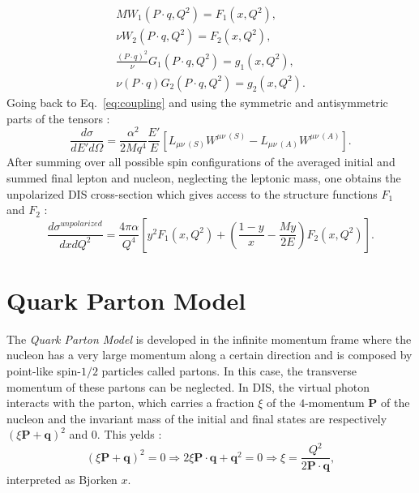 %
\begin{equation}
  \begin{split}
    MW_1(P\cdot q,Q^2)=F_1(x,Q^2), \\
    \nu W_2(P\cdot q,Q^2)=F_2(x,Q^2), \\
    \frac{(P\cdot q)^2}{\nu}G_1(P\cdot q,Q^2)=g_1(x,Q^2), \\
    \nu(P\cdot q)G_2(P\cdot q,Q^2)=g_2(x,Q^2).
  \end{split}
  \label{eq:dimless}
\end{equation}
%
Going back to Eq.~\ref{eq:coupling} and using the symmetric and antisymmetric parts of the tensors :
%
\begin{equation}
  \frac{d\sigma}{dE'd\Omega} = \frac{\alpha^2}{2Mq^4}\frac{E'}{E}\left[L_{\mu\nu\ (S)}W^{\mu\nu\ (S)}-L_{\mu\nu\ (A)}W^{\mu\nu\ (A)}\right].
\end{equation}
%
After summing over all possible spin configurations of the averaged initial and summed final lepton and nucleon, neglecting the leptonic mass, one obtains the unpolarized DIS cross-section which gives access to the structure functions $F_1$ and $F_2$ :
%
\begin{equation}
  \frac{d\sigma^{unpolarized}}{dxdQ^2} = \frac{4\pi\alpha}{Q^4}\left[y^2F_1(x,Q^2)+\left(\frac{1-y}{x}-\frac{My}{2E}\right)F_2(x,Q^2)\right].
  \label{eq:unpolDIS}
\end{equation}


\section{Quark Parton Model}

The \textit{Quark Parton Model} \cite{Bjorken,Feynman} is developed in the infinite momentum frame where the nucleon has a very large momentum along a certain direction and is composed by point-like spin-$1/2$ particles called partons. In this case, the transverse momentum of these partons can be neglected. In DIS, the virtual photon interacts with the parton, which carries a fraction $\xi$ of the $4$-momentum \textbf{P} of the nucleon and the invariant mass of the initial and final states are respectively $(\xi\textbf{P}+\textbf{q})^2$ and $0$. This yelds :
%
\begin{equation}
  (\xi\textbf{P}+\textbf{q})^2 = 0 \Rightarrow 2\xi\textbf{P}\cdot\textbf{q}+\textbf{q}^2 = 0 \Rightarrow \xi = \frac{Q^2}{2\textbf{P}\cdot\textbf{q}},
\end{equation}
%
interpreted as Bjorken $x$.

